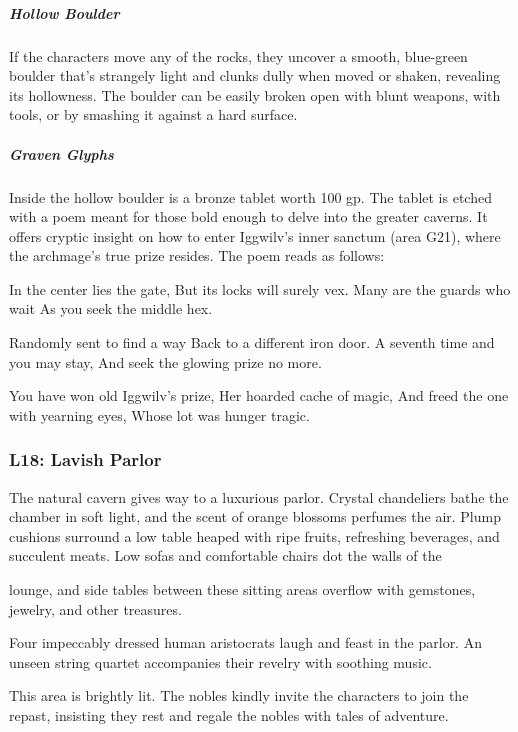 \documentclass[10pt,a4paper,twoside,bg=print,twocolumn,openany,nodeprecatedcode]{dndbook}
\begin{document}
\subparagraph{Hollow Boulder}
If the characters move any of the rocks, they uncover a smooth, blue-green boulder that's strangely light and clunks dully when moved or shaken, revealing its hollowness. The boulder can be easily broken open with blunt weapons, with tools, or by smashing it against a hard surface.

\subparagraph{Graven Glyphs}
Inside the hollow boulder is a bronze tablet worth 100 gp. The tablet is etched with a poem meant for those bold enough to delve into the greater caverns. It offers cryptic insight on how to enter Iggwilv's inner sanctum (area G21), where the archmage's true prize resides. The poem reads as follows:

\begin{DndReadAloud}{}
In the center lies the gate, But its locks will surely vex. Many are the guards who wait As you seek the middle hex.

Randomly sent to find a way Back to a different iron door. A seventh time and you may stay, And seek the glowing prize no more.

You have won old Iggwilv's prize, Her hoarded cache of magic, And freed the one with yearning eyes, Whose lot was hunger tragic.

\end{DndReadAloud}

\subsubsection{L18: Lavish Parlor}
\begin{DndReadAloud}{}
The natural cavern gives way to a luxurious parlor. Crystal chandeliers bathe the chamber in soft light, and the scent of orange blossoms perfumes the air. Plump cushions surround a low table heaped with ripe fruits, refreshing beverages, and succulent meats. Low sofas and comfortable chairs dot the walls of the

lounge, and side tables between these sitting areas overflow with gemstones, jewelry, and other treasures.

Four impeccably dressed human aristocrats laugh and feast in the parlor. An unseen string quartet accompanies their revelry with soothing music.

\end{DndReadAloud}

This area is brightly lit. The nobles kindly invite the characters to join the repast, insisting they rest and regale the nobles with tales of adventure.
\end{document}
